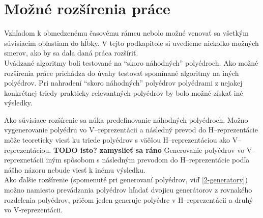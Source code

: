 \section{Možné rozšírenia práce}

Vzhľadom k obmedzenému časovému rámcu nebolo možné venovať sa všetkým súvisiacim oblastiam do hĺbky. V tejto podkapitole si uvedieme niekoľko možných smerov, ako by sa dala daná práca rozšíriť.\\

Uvádzané algoritmy boli testované na ``skoro náhodných'' polyédroch. Ako možné rozšírenia práce prichádza do úvahy testovať spomínané algoritmy na iných polyédrov. Pri nahradení ``skoro náhodných'' polyédrov polyédrami z nejakej konkrétnej triedy prakticky relevantných polyédrov by bolo možné získať iné výsledky. 

Ako súvisiace rozšírenie sa núka predefinovanie náhodných polyédroch. Možno vygenerovanie polyédru vo V--reprezentácii a následný prevod do H--reprezentácie môže teoreticky viesť ku triede polyédrov s väčšou H--reprezentáciou ako V--reprezentáciou. \textbf{TODO isto? zamyslieť sa ráno} Generovanie polyédrov vo V--repreznetácii iným spôsobom s následným prevodom do H--reprezentácie podľa nášho názoru nebude viesť k inému výsledku.\\

Ako ďalšie rozšírenie (spomenuté pri generovaní polyédrov, viď \ref{2-generatory}) možno namiesto prevádzania polyédrov hľadať dvojicu generátorov z rovnakého rozdelenia polyédrov, pričom jeden generuje polyédre v H--reprezentácii a druhý vo V-reprezentácii.







